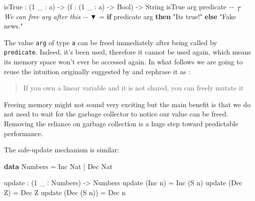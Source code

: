 \documentclass[
]{article}
\newenvironment{Shaded}{}{}
\newcommand{\CommentTok}[1]{\textcolor[rgb]{0.38,0.63,0.69}{\textit{#1}}}
\newcommand{\DataTypeTok}[1]{\textcolor[rgb]{0.56,0.13,0.00}{#1}}
\newcommand{\DecValTok}[1]{\textcolor[rgb]{0.25,0.63,0.44}{#1}}
\newcommand{\KeywordTok}[1]{\textcolor[rgb]{0.00,0.44,0.13}{\textbf{#1}}}
\newcommand{\NormalTok}[1]{#1}
\newcommand{\OperatorTok}[1]{\textcolor[rgb]{0.40,0.40,0.40}{#1}}
\newcommand{\OtherTok}[1]{\textcolor[rgb]{0.00,0.44,0.13}{#1}}
\newcommand{\StringTok}[1]{\textcolor[rgb]{0.25,0.44,0.63}{#1}}
\begin{document}
\begin{Shaded}
\begin{Highlighting}[]
\NormalTok{isTrue }\OperatorTok{:}\NormalTok{ (}\DecValTok{1}\NormalTok{ \_ }\OperatorTok{:}\NormalTok{ a) }\OtherTok{{-}\textgreater{}}\NormalTok{ (f }\OperatorTok{:}\NormalTok{ (}\DecValTok{1}\NormalTok{ \_ }\OperatorTok{:}\NormalTok{ a) }\OtherTok{{-}\textgreater{}} \DataTypeTok{Bool}\NormalTok{) }\OtherTok{{-}\textgreater{}} \DataTypeTok{String}
\NormalTok{isTrue arg predicate}
\CommentTok{{-}{-}                ┌ We can free \textasciigrave{}arg\textasciigrave{} after this}
\CommentTok{{-}{-}                ▼}
  \OtherTok{=} \KeywordTok{if}\NormalTok{ predicate arg }\KeywordTok{then} \StringTok{"It\textquotesingle{}s true!"}
                       \KeywordTok{else} \StringTok{"Fake news."}
\end{Highlighting}
\end{Shaded}

The value \texttt{arg} of type \texttt{a} can be freed immediately after
being called by \texttt{predicate}. Indeed, it's been used, therefore it
cannot be used again, which means its memory space won't ever be
accessed again. In what follows we are going to reuse the intuition
originally suggested by
\cite{once_upon_a_type}\cite{linear_types_update}\cite{linear_use} and
rephrase it as :

\begin{quote}
If you own a linear variable and it is not shared, you can freely mutate
it
\end{quote}

Freeing memory might not sound very exciting but the main benefit is
that we do not need to wait for the garbage collector to notice our
value can be freed. Removing the reliance on garbage collection is a
huge step toward predictable performance.

The safe-update mechanism is similar:

\begin{Shaded}
\begin{Highlighting}[]
\KeywordTok{data} \DataTypeTok{Numbers} \OtherTok{=} \DataTypeTok{Inc} \DataTypeTok{Nat} \OperatorTok{|} \DataTypeTok{Dec} \DataTypeTok{Nat}

\NormalTok{update }\OperatorTok{:}\NormalTok{ (}\DecValTok{1}\NormalTok{ \_ }\OperatorTok{:} \DataTypeTok{Numbers}\NormalTok{) }\OtherTok{{-}\textgreater{}} \DataTypeTok{Numbers}
\NormalTok{update (}\DataTypeTok{Inc}\NormalTok{ n) }\OtherTok{=} \DataTypeTok{Inc}\NormalTok{ (}\DataTypeTok{S}\NormalTok{ n)}
\NormalTok{update (}\DataTypeTok{Dec} \DataTypeTok{Z}\NormalTok{) }\OtherTok{=} \DataTypeTok{Dec} \DataTypeTok{Z}
\NormalTok{update (}\DataTypeTok{Dec}\NormalTok{ (}\DataTypeTok{S}\NormalTok{ n)) }\OtherTok{=} \DataTypeTok{Dec}\NormalTok{ n}
\end{Highlighting}
\end{Shaded}
\end{document}
